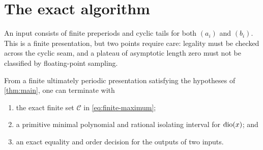 \section{The exact algorithm}
\label{sec:algorithm}

An input consists of finite preperiods and cyclic tails for both $(a_i)$ and
$(b_i)$.  This is a finite presentation, but two points require care: legality
must be checked across the cyclic seam, and a plateau of asymptotic length zero
must not be classified by floating-point sampling.

\begin{proposition}
\label{prop:exact-algorithm}
From a finite ultimately periodic presentation satisfying the hypotheses of
\cref{thm:main}, one can terminate with
\begin{enumerate}[label=\textup{(\roman*)}]
\item the exact finite set $\mathcal C$ in \eqref{eq:finite-maximum};
\item a primitive minimal polynomial and rational isolating interval for
      $\operatorname{dio}(x)$; and
\item an exact equality and order decision for the outputs of two inputs.
\end{enumerate}
\end{proposition}

